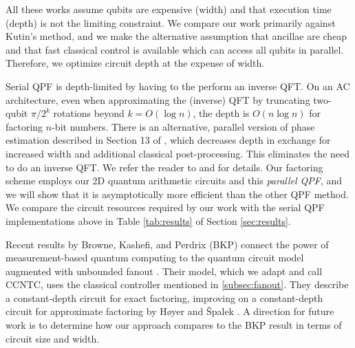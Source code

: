 All these works assume qubits are expensive (width) and that
execution time (depth) is not the limiting constraint.
We compare our work primarily against Kutin's method, and we make the
alternative assumption that ancillae are cheap and that fast classical control
is available which can access all qubits in parallel. Therefore, we optimize
circuit depth at the expense of width.

Serial QPF is depth-limited by having to the perform an inverse QFT.
On an AC architecture, even when approximating the (inverse) QFT
by truncating two-qubit
$\pi/2^k$ rotations beyond
$k = O(\log n)$, the depth is $O(n \log n)$ for factoring $n$-bit numbers.
There is an alternative, parallel version of phase estimation described in
Section 13 of \cite{Kitaev2002}, which decreases depth in exchange
for increased width and additional classical post-processing.
This eliminates the need to do an inverse QFT.
We refer the reader to \cite{Kitaev2002} and \cite{Pham2011b} for details.
Our factoring scheme employs our 2D quantum arithmetic circuits and this
\emph{parallel QPF}, and we will show that it is asymptotically more
efficient than the other QPF method. We compare the circuit resources
required by our work with the serial QPF implementations above in Table
\ref{tab:results} of Section \ref{sec:results}.

Recent results by Browne, Kashefi, and Perdrix (BKP) connect the power of
measurement-based quantum computing to the quantum circuit model augmented with
unbounded fanout \cite{Browne2009}. Their model, which we adapt and call
\textsc{CCNTC}, uses the classical controller mentioned in \ref{subsec:fanout}.
They describe a constant-depth circuit for
exact factoring, improving on a constant-depth circuit for approximate factoring
by H{\o}yer and {\v S}palek \cite{Hoyer2002}.
A direction for future work is to determine how our approach compares to the
BKP result in terms of circuit size and width.

